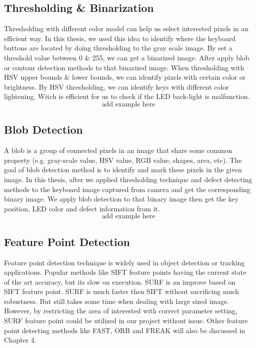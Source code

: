     \subsection{Thresholding \& Binarization}
        Thresholding with different color model can help us select interested pixels in an efficient way.
        In this thesis, we used this idea to identify where the keyboard buttons are located by doing thresholding to the gray scale image.
        By set a threshold value between 0 \& 255, we can get a binarized image.
        After apply blob or contour detection methods to that  binarized image.
        When thresholding with HSV upper bounds \& lower bounds, we can identify pixels with certain color or brightness.
        By HSV thresholding, we can identify keys with different color lightening.
        Witch is efficient for us to check if the LED back-light is malfunction.
        $$ \textrm{add example here} $$

    \subsection{Blob Detection}
        A blob is a group of connected pixels in an image that share some common property (e.g. gray-scale value, HSV value, RGB value, shapes, area, etc).
        The goal of blob detection method is to identify and mark these pixels in the given image.
        In this thesis, after we applied thresholding technique and defect detecting methods to the keyboard image captured from camera and get the corresponding binary image.
        We apply blob detection to that binary image then get the key position, LED color and defect information from it.
        $$ \textrm{add example here} $$

    \subsection{Feature Point Detection}
        Feature point detection technique is widely used in object detection or tracking applications.
        Popular methods like SIFT feature points having the current state of the art accuracy, but its slow on execution.
        SURF is an improve based on SIFT feature point. SURF is much faster then SIFT without sacrificing much robustness. But still takes some time when dealing with large sized image. 
        However, by restricting the area of interested with correct parameter setting, SURF feature point could be utilized in our project without issue.
        Other feature point detecting methods like FAST, ORB and FREAK will also be discussed in Chapter 4.

